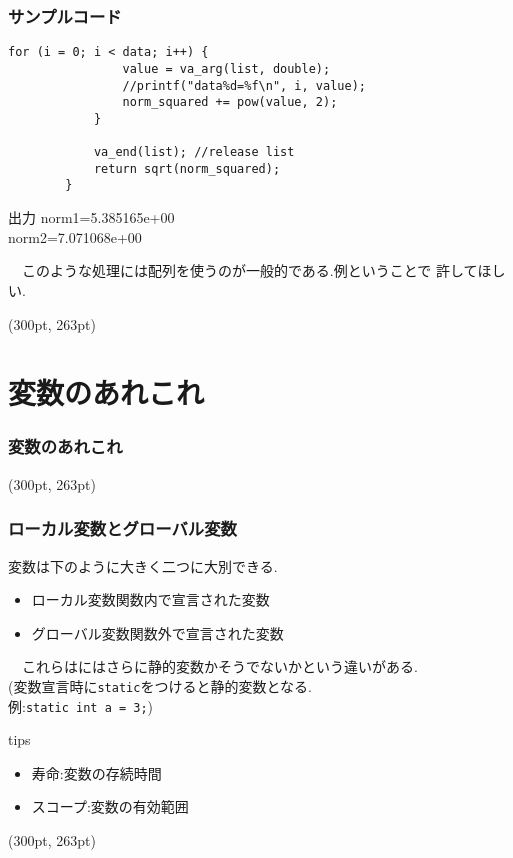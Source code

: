\documentclass[dvipdfmx]{beamer}
\begin{document}
\begin{frame}[t, fragile]
    \frametitle{サンプルコード}
    \begin{lstlisting}[gobble=8, firstnumber=32, caption=pra\_func.c]
            for (i = 0; i < data; i++) {
                value = va_arg(list, double);
                //printf("data%d=%f\n", i, value);
                norm_squared += pow(value, 2);
            }
            
            va_end(list); //release list
            return sqrt(norm_squared);
        }
    \end{lstlisting}
    \begin{block}{出力}
        norm1=5.385165e+00\\
        norm2=7.071068e+00
    \end{block}
    　このような処理には配列を使うのが一般的である.例ということで
    許してほしい.
    \begin{textblock*}{0.3\linewidth}(300pt, 263pt)
    \space
    \end{textblock*}
\end{frame}

\section{変数のあれこれ}
\begin{frame}[t, fragile]
    \frametitle{変数のあれこれ}
    \tableofcontents[sections={2,9}]
    \begin{textblock*}{0.3\linewidth}(300pt, 263pt)
    \space
    \end{textblock*}
\end{frame}
\begin{frame}[c, fragile]
    \frametitle{ローカル変数とグローバル変数}
    変数は下のように大きく二つに大別できる.
    \begin{itemize}
        \item ローカル変数\qquad 関数内で宣言された変数
        \item グローバル変数\qquad 関数外で宣言された変数
    \end{itemize}
    　これらはにはさらに静的変数かそうでないかという違いがある.\\
    (変数宣言時に\texttt{static}をつけると静的変数となる.\\
    \qquad 例:\space \texttt{static int a = 3;})
    \begin{itembox}[l]{tips}
        \begin{itemize}
            \item 寿命:変数の存続時間
            \item スコープ:変数の有効範囲
        \end{itemize}
    \end{itembox}
    \begin{textblock*}{0.3\linewidth}(300pt, 263pt)
    \space
    \end{textblock*}
\end{frame}
\end{document}
